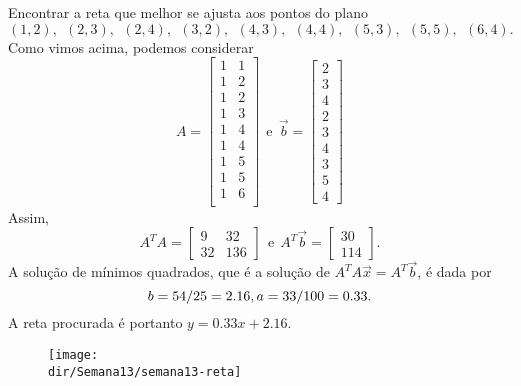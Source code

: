 \documentclass[../livro.tex]{subfiles}  %
\providecommand{\dir}{..}
\begin{document}
\begin{example}
  Encontrar a reta que melhor se ajusta aos pontos do plano
  \begin{equation}
  (1,2), \ \ (2,3), \ \ (2,4), \ \ (3,2), \ \ (4,3), \ \ (4,4), \ \ (5,3), \ \ (5,5), \ \ (6,4).
  \end{equation} Como vimos acima, podemos considerar
  \begin{equation}
  A =
  \begin{bmatrix}
    1 & 1 \\
    1 & 2 \\
    1 & 2 \\
    1 & 3 \\
    1 & 4 \\
    1 & 4 \\
    1 & 5 \\
    1 & 5 \\
    1 & 6 \\
  \end{bmatrix} \ \ \text{e} \ \
  \vec{b} =
  \begin{bmatrix}
    2\\3\\4\\2\\3\\4\\3\\5\\4
  \end{bmatrix}
  \end{equation} Assim,
  \begin{equation}
  A^T A =
  \begin{bmatrix}
    9  & 32  \\
    32  & 136
  \end{bmatrix}  \ \ \text{e} \ \
  A^T \vec{b} =
  \begin{bmatrix}
    30\\114
  \end{bmatrix}.
  \end{equation} A solução de mínimos quadrados, que é a solução de $A^T A \vec{x} = A^T\vec{b}$, é dada por
  \begin{equation}
  b = 54/25 = 2.16, \\ a = 33/100 = 0.33.
  \end{equation} A reta procurada é portanto $y = 0.33 x + 2.16$.
  \begin{figure}[h!]
    \begin{center}
      \texttt{[image: \\dir/Semana13/semana13-reta]}
    \end{center}
  \end{figure}
\end{example}
\end{document}
